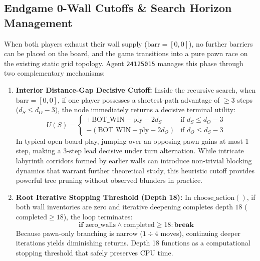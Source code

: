 \subsection{Endgame 0-Wall Cutoffs \& Search Horizon Management}
When both players exhaust their wall supply ($\text{barr} = [0, 0]$), no further barriers can be placed on the board, and the game transitions into a pure pawn race on the existing static grid topology. Agent \texttt{24125015} manages this phase through two complementary mechanisms:
\begin{enumerate}[leftmargin=1.5em]
    \item \textbf{Interior Distance-Gap Decisive Cutoff:} Inside the recursive search, when $\text{barr} = [0, 0]$, if one player possesses a shortest-path advantage of $\ge 3$ steps ($d_S \le d_O - 3$), the node immediately returns a decisive terminal utility:
    \begin{equation}
        U(S) = \begin{cases}
            +\text{BOT\_WIN} - \text{ply} - 2 d_S & \text{if } d_S \le d_O - 3 \\
            -(\text{BOT\_WIN} - \text{ply} - 2 d_O) & \text{if } d_O \le d_S - 3
        \end{cases}
    \end{equation}
    In typical open board play, jumping over an opposing pawn gains at most 1 step, making a 3-step lead decisive under turn alternation. While intricate labyrinth corridors formed by earlier walls can introduce non-trivial blocking dynamics that warrant further theoretical study, this heuristic cutoff provides powerful tree pruning without observed blunders in practice.
    \item \textbf{Root Iterative Stopping Threshold (Depth 18):} In $\text{choose\_action}()$, if both wall inventories are zero and iterative deepening completes depth $18$ ($\text{completed} \ge 18$), the loop terminates:
    \begin{equation}
        \textbf{if } \text{zero\_walls} \land \text{completed} \ge 18: \textbf{break}
    \end{equation}
    Because pawn-only branching is narrow ($1 \div 4$ moves), continuing deeper iterations yields diminishing returns. Depth 18 functions as a computational stopping threshold that safely preserves CPU time.
\end{enumerate}

